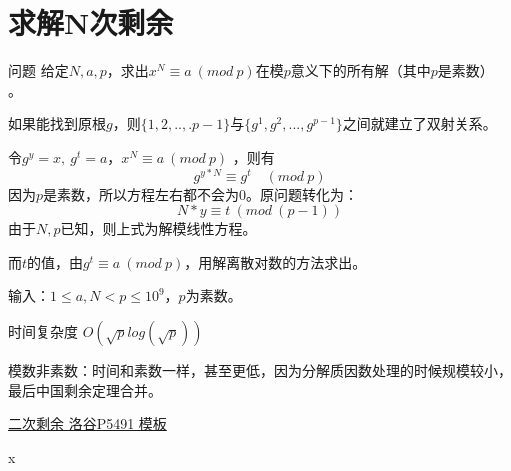 \section{求解N次剩余}
\begin{custom}{问题}
	给定$N,a,p$，求出$x^N\equiv a\ (mod \ p)$在模$p$意义下的所有解（其中$p$是素数） 。
\end{custom}

\begin{solution}
	如果能找到原根$g$，则$\{1,2,..,.p-1\}$与$\{g^1,g^2,...,g^{p-1}\}$之间就建立了双射关系。
	
	令$g^y=x,\ g^t=a$，$x^N\equiv a\ (mod \ p)$ ，则有
	$$
	g^{y*N}\equiv g^t  \quad (mod \ p)
	$$
	因为$p$是素数，所以方程左右都不会为0。原问题转化为：
	$$
	N*y\equiv t\ (mod \ (p-1))
	$$
	由于$N,p$已知，则上式为解模线性方程。
	
	而$t$的值，由$g^t\equiv a \ (mod\ p)$，用解离散对数的方法求出。
\end{solution}

输入：$1 \le a, N < p \le 10^9$，$p$为素数。

{\heiti 时间复杂度}  $O(\sqrt{p}log(\sqrt{p}))$  

{\heiti
模数非素数：时间和素数一样，甚至更低，因为分解质因数处理的时候规模较小，最后中国剩余定理合并。
}



\begin{problemset}
	\item \href{https://www.luogu.org/problem/P5491}{二次剩余 \quad 洛谷P5491 \quad 模板}
	\item x  
\end{problemset}